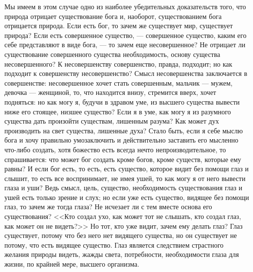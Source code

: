 \documentclass[12pt]{article}
\begin{document}
Мы имеем в этом случае одно из наиболее убедительных доказательств того, что природа отрицает существование бога и, наоборот, существованием бога отрицается природа. Если есть бог, то зачем же существует мир, существует природа? Если есть совершенное существо, --- совершенное существо, каким его себе представляют в виде бога, --- то зачем еще несовершенное? Не отрицает ли существование совершенного существа необходимость, основу существа несовершенного? К несовершенству совершенство, правда, подходит; но как подходит к совершенству несовершенство? Смысл несовершенства заключается в совершенстве: несовершенное хочет стать совершенным, мальчик --- мужем, девочка --- женщиной, то, что находится внизу, стремится вверх, хочет подняться: но как могу я, будучи в здравом уме, из высшего существа вывести ниже его стоящее, низшее существо? Если я в уме, как могу я из разумного существа дать произойти существам, лишенным разума? Как может дух производить на свет существа, лишенные духа? Стало быть, если я себе мыслю бога и хочу правильно умозаключить и действительно заставить его мысленно что-либо создать, хотя божество есть всегда нечто непроизводительное, то спрашивается: что может бог создать кроме богов, кроме существ, которые ему равны? И если бог есть, то есть, есть существо, которое видит без помощи глаз и слышит, то есть все воспринимает, не имея ушей, то как могу я от него вывести глаза и уши? Ведь смысл, цель, существо, необходимость существования глаз и ушей есть только зрение и слух; но если уже есть существо, видящее без помощи глаз, то зачем же тогда глаза? Не исчезает ли с тем вместе основа его существования? <<Кто создал ухо, как может тот не слышать, кто создал глаз, как может он не видеть?>> Но тот, кто уже видит, зачем ему делать глаз? Глаз существует, потому что без него нет видящего существа, но он существует не потому, что есть видящее существо. Глаз является следствием страстного желания природы видеть, жажды света, потребности, необходимости глаза для жизни, по крайней мере, высшего организма. 
\end{document}
